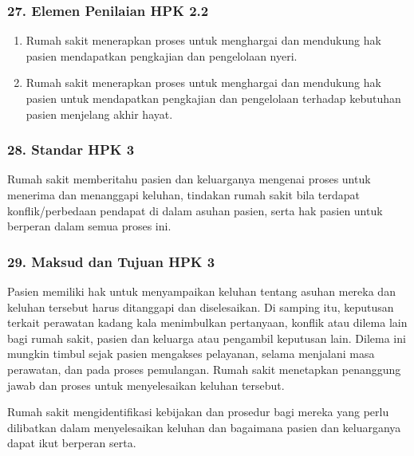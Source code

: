 \documentclass[
]{book}
\providecommand{\tightlist}{%
  \setlength{\itemsep}{0pt}\setlength{\parskip}{0pt}}
\begin{document}
\hypertarget{elemen-penilaian-hpk-2.2}{%
\subsubsection*{27. Elemen Penilaian HPK 2.2}\label{elemen-penilaian-hpk-2.2}}

\begin{enumerate}
\def\labelenumi{\alph{enumi}.}
\tightlist
\item
  Rumah sakit menerapkan proses untuk menghargai dan mendukung hak pasien mendapatkan pengkajian dan pengelolaan nyeri.
\item
  Rumah sakit menerapkan proses untuk menghargai dan mendukung hak pasien untuk mendapatkan pengkajian dan pengelolaan terhadap kebutuhan pasien menjelang akhir hayat.
\end{enumerate}

\hypertarget{standar-hpk-3}{%
\subsubsection*{28. Standar HPK 3}\label{standar-hpk-3}}

Rumah sakit memberitahu pasien dan keluarganya mengenai proses untuk menerima dan menanggapi keluhan, tindakan rumah sakit bila terdapat konflik/perbedaan pendapat di dalam asuhan pasien, serta hak pasien untuk berperan dalam semua proses ini.

\hypertarget{maksud-dan-tujuan-hpk-3}{%
\subsubsection*{29. Maksud dan Tujuan HPK 3}\label{maksud-dan-tujuan-hpk-3}}

Pasien memiliki hak untuk menyampaikan keluhan tentang asuhan mereka dan keluhan tersebut harus ditanggapi dan diselesaikan. Di samping itu, keputusan terkait perawatan kadang kala menimbulkan pertanyaan, konflik atau dilema lain bagi rumah sakit, pasien dan keluarga atau pengambil keputusan lain. Dilema ini mungkin timbul sejak pasien mengakses pelayanan, selama menjalani masa perawatan, dan pada proses pemulangan. Rumah sakit menetapkan penanggung jawab dan proses untuk menyelesaikan keluhan tersebut.

Rumah sakit mengidentifikasi kebijakan dan prosedur bagi mereka yang perlu dilibatkan dalam menyelesaikan keluhan dan bagaimana pasien dan keluarganya dapat ikut berperan serta.
\end{document}
